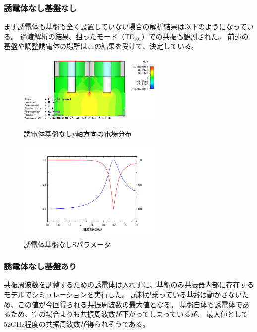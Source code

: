 \subsubsection{誘電体なし基盤なし}
まず誘電体も基盤も全く設置していない場合の解析結果は以下のようになっている。
過渡解析の結果、狙ったモード（TE$_{101}$）での共振も観測された。
前述の基盤や調整誘電体の場所はこの結果を受けて、決定している。

\begin{figure}[h]
 \begin{minipage}{0.5\hsize}
  \begin{center}
   \includegraphics[width=70mm]{./image/model73_vac.png}
  \end{center}
  \caption{誘電体基盤なしy軸方向の電場分布}
  \label{fig:one}
 \end{minipage}
 \begin{minipage}{0.5\hsize}
  \begin{center}
   \includegraphics[width=70mm]{./image/Graph1.jpg}
  \end{center}
  \caption{誘電体基盤なしSパラメータ}
  \label{fig:two}
 \end{minipage}
\end{figure}

\subsubsection{誘電体なし基盤あり}
共振周波数を調整するための誘電体は入れずに、基盤のみ共振器内部に存在するモデルでシミュレーションを実行した。
試料が乗っている基盤は動かさないため、この値が今回得られる共振周波数の最大値となる。
基盤自体も誘電体であるため、空の場合よりも共振周波数が下がってしまっているが、
最大値として52GHz程度の共振周波数が得られそうである。


